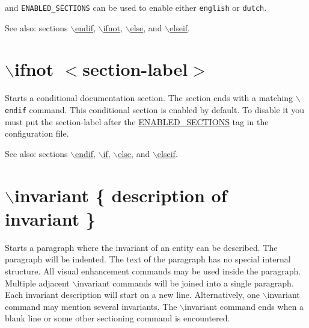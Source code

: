 and {\tt ENABLED\_\-SECTIONS} can be used to enable either {\tt english} or {\tt dutch}.

\begin{Desc}
\item[See also:]sections \hyperlink{commands_cmdendif}{$\backslash$endif}, \hyperlink{commands_cmdifnot}{$\backslash$ifnot}, \hyperlink{commands_cmdelse}{$\backslash$else}, and \hyperlink{commands_cmdelseif}{$\backslash$elseif}.\end{Desc}


 \hypertarget{commands_cmdifnot}{}\section{$\backslash$ifnot $<$section-label$>$}\label{commands_cmdifnot}
 Starts a conditional documentation section. The section ends with a matching {\tt $\backslash$endif} command. This conditional section is enabled by default. To disable it you must put the section-label after the \hyperlink{config_cfg_enabled_sections}{ENABLED\_\-SECTIONS} tag in the configuration file.

\begin{Desc}
\item[See also:]sections \hyperlink{commands_cmdendif}{$\backslash$endif}, \hyperlink{commands_cmdif}{$\backslash$if}, \hyperlink{commands_cmdelse}{$\backslash$else}, and \hyperlink{commands_cmdelseif}{$\backslash$elseif}.\end{Desc}


 \hypertarget{commands_cmdinvariant}{}\section{$\backslash$invariant \{ description of invariant \}}\label{commands_cmdinvariant}
 Starts a paragraph where the invariant of an entity can be described. The paragraph will be indented. The text of the paragraph has no special internal structure. All visual enhancement commands may be used inside the paragraph. Multiple adjacent $\backslash$invariant commands will be joined into a single paragraph. Each invariant description will start on a new line. Alternatively, one $\backslash$invariant command may mention several invariants. The $\backslash$invariant command ends when a blank line or some other sectioning command is encountered.



